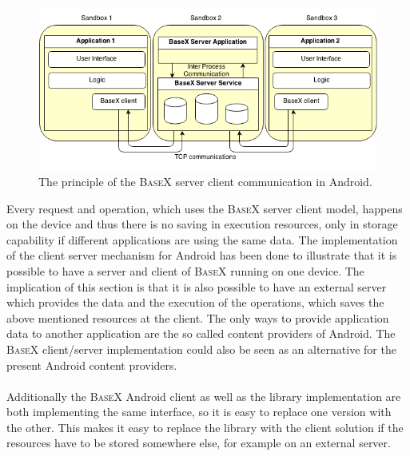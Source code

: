 \begin{figure}[h]
\begin{center}
\includegraphics[scale=0.6]{images/basex-server-client.png} 
\caption{The principle of the \textsc{BaseX} server client communication in Android.}
\label{fig:server-client-android}
\end{center}
\end{figure}

Every request and operation, which uses the \textsc{BaseX} server client model, happens on the device and thus there is no saving in execution resources, only in storage capability if different applications are using the same data.
The implementation of the client server mechanism for Android has been done to illustrate that it is possible to have a server and client of \textsc{BaseX} running on one device.
The implication of this section is that it is also possible to have an external server which provides the data and the execution of the operations, which saves the above mentioned resources at the client.
The only ways to provide application data to another application are the so called content providers of Android.
The \textsc{BaseX} client/server implementation could also be seen as an alternative for the present Android content providers.\\
\\
Additionally the \textsc{BaseX} Android client as well as the library implementation are both implementing the same interface, so it is easy to replace one version with the other.
This makes it easy to replace the library with the client solution if the resources have to be stored somewhere else, for example on an external server.



